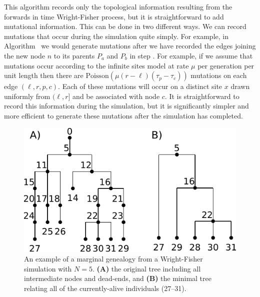 \documentclass{article}
\begin{document}
This algorithm records only the topological information resulting from the
forwards in time Wright-Fisher process, but it is straightforward to add
mutational information. This can be done in two different ways.
We can record mutations that occur during the simulation quite simply.
For example, in Algorithm~ we would generate mutations after
we have recorded the edges joining the new node $n$ to its parents
$P_a$ and $P_b$ in step .
For example, if we assume that mutations occur according to the infinite sites model
at rate $\mu$ per generation per unit length then there are
$\mbox{Poisson}\left(\mu (r - \ell)(\tau_p
- \tau_c)\right)$ mutations on each edge $(\ell, r, p, c)$. Each of these mutations
will occur on a distinct site $x$ drawn uniformly from $(\ell, r]$ and be associated with node $c$.
It is straightforward to record this information during the simulation, but it
is significantly simpler and more efficient to generate these mutations
after the simulation has completed.

\begin{figure}
    \begin{center}
        \includegraphics{wf-before-after}
    \end{center}
    \caption{An example of a marginal genealogy from a Wright-Fisher simulation
    with $N=5$. \textbf{(A)} the original tree including all
    intermediate nodes and dead-ends, and \textbf{(B)} the minimal tree
    relating all of the currently-alive individuals (27--31).
    \label{fig:wf-trees}
    }
\end{figure}
\end{document}
